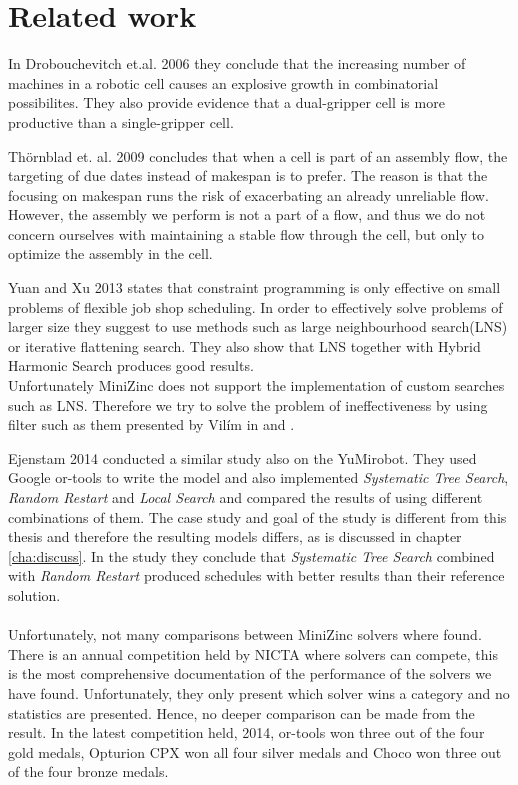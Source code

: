 \section{Related work}
In Drobouchevitch et.al. 2006 they conclude that the increasing number of machines in a robotic cell causes an explosive growth in combinatorial possibilites. They also provide evidence that a dual-gripper cell is more productive than a single-gripper cell.\cite{sethi_2006}

Thörnblad et. al. 2009 concludes that when a cell is part of an assembly flow, the targeting of due dates instead of makespan is to prefer. The reason is that the focusing on makespan runs the risk of exacerbating an already unreliable flow.\cite{thornblad_2013} However, the assembly we perform is not a part of a flow, and thus we do not concern ourselves with maintaining a stable flow through the cell, but only to optimize the assembly in the cell.

Yuan and Xu 2013 states that constraint programming is only effective on small problems of flexible job shop scheduling. In order to effectively solve problems of larger size they suggest to use methods such as large neighbourhood search(LNS) or iterative flattening search. They also show that LNS together with Hybrid Harmonic Search produces good results.\cite{yuan_2013}
\\
Unfortunately MiniZinc does not support the implementation of custom searches such as LNS. Therefore we try to solve the problem of ineffectiveness by using filter such as them presented by Vilím in \cite{VilimBartak2002Batch} \cite{Vilim2002Precedence} and \cite{VilimBartak2002Sequence}.

Ejenstam 2014 conducted a similar study also on the YuMi\textsuperscript\textregistered robot. They used Google or-tools to write the model and also implemented \emph{Systematic Tree Search}, \emph{Random Restart} and \emph{Local Search} and compared the results of using different combinations of them. The case study and goal of the study is different from this thesis and therefore the resulting models differs, as is discussed in chapter \ref{cha:discuss}. In the study they conclude that \emph{Systematic Tree Search} combined with \emph{Random Restart} produced schedules with better results than their reference solution.\cite{ejenstam_2014}
\\\\
Unfortunately, not many comparisons between MiniZinc solvers where found. There is an annual competition held by NICTA where solvers can compete, this is the most comprehensive documentation of the performance of the solvers we have found. Unfortunately, they only present which solver wins a category and no statistics are presented. Hence, no deeper comparison can be made from the result. In the latest competition held, 2014, or-tools won three out of the four gold medals, Opturion CPX won all four silver medals and Choco won three out of the four bronze medals.\cite{mz_result_2014}

